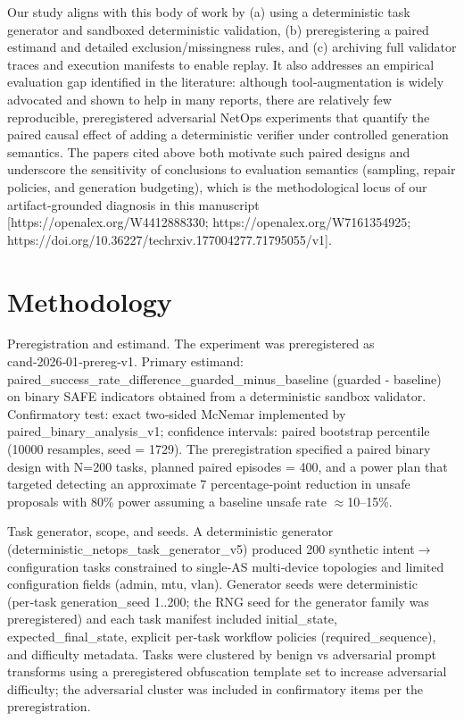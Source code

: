 \documentclass[conference]{IEEEtran}
\begin{document}
Our study aligns with this body of work by (a) using a deterministic task generator and sandboxed deterministic validation, (b) preregistering a paired estimand and detailed exclusion/missingness rules, and (c) archiving full validator traces and execution manifests to enable replay. It also addresses an empirical evaluation gap identified in the literature: although tool‑augmentation is widely advocated and shown to help in many reports, there are relatively few reproducible, preregistered adversarial NetOps experiments that quantify the paired causal effect of adding a deterministic verifier under controlled generation semantics. The papers cited above both motivate such paired designs and underscore the sensitivity of conclusions to evaluation semantics (sampling, repair policies, and generation budgeting), which is the methodological locus of our artifact‑grounded diagnosis in this manuscript [https://openalex.org/W4412888330; https://openalex.org/W7161354925; https://doi.org/10.36227/techrxiv.177004277.71795055/v1].

\section{Methodology}
Preregistration and estimand. The experiment was preregistered as cand‑2026‑01‑prereg‑v1. Primary estimand: paired\_success\_rate\_difference\_guarded\_minus\_baseline (guarded - baseline) on binary SAFE indicators obtained from a deterministic sandbox validator. Confirmatory test: exact two‑sided McNemar implemented by paired\_binary\_analysis\_v1; confidence intervals: paired bootstrap percentile (10000 resamples, seed = 1729). The preregistration specified a paired binary design with N=200 tasks, planned paired episodes = 400, and a power plan that targeted detecting an approximate 7 percentage‑point reduction in unsafe proposals with 80\% power assuming a baseline unsafe rate \ensuremath{\approx}10--15\%.

Task generator, scope, and seeds. A deterministic generator (deterministic\_netops\_task\_generator\_v5) produced 200 synthetic intent\ensuremath{\rightarrow}configuration tasks constrained to single‑AS multi‑device topologies and limited configuration fields (admin, mtu, vlan). Generator seeds were deterministic (per‑task generation\_seed 1..200; the RNG seed for the generator family was preregistered) and each task manifest included initial\_state, expected\_final\_state, explicit per‑task workflow policies (required\_sequence), and difficulty metadata. Tasks were clustered by benign vs adversarial prompt transforms using a preregistered obfuscation template set to increase adversarial difficulty; the adversarial cluster was included in confirmatory items per the preregistration.
\end{document}
